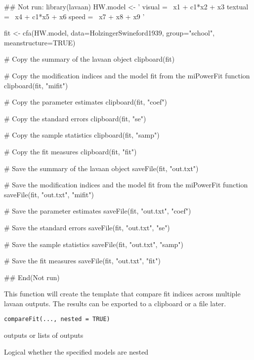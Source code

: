 \documentclass[a4paper]{book}
\begin{document}
\begin{Examples}
\begin{ExampleCode}
## Not run: 
library(lavaan)
HW.model <- ' visual  =~ x1 + c1*x2 + x3
              textual =~ x4 + c1*x5 + x6
               speed   =~ x7 + x8 + x9 '

fit <- cfa(HW.model, data=HolzingerSwineford1939, group="school", meanstructure=TRUE)

# Copy the summary of the lavaan object
clipboard(fit)

# Copy the modification indices and the model fit from the miPowerFit function
clipboard(fit, "mifit")

# Copy the parameter estimates
clipboard(fit, "coef")

# Copy the standard errors
clipboard(fit, "se")

# Copy the sample statistics
clipboard(fit, "samp")

# Copy the fit measures
clipboard(fit, "fit")

# Save the summary of the lavaan object
saveFile(fit, "out.txt")

# Save the modification indices and the model fit from the miPowerFit function
saveFile(fit, "out.txt", "mifit")

# Save the parameter estimates
saveFile(fit, "out.txt", "coef")

# Save the standard errors
saveFile(fit, "out.txt", "se")

# Save the sample statistics
saveFile(fit, "out.txt", "samp")

# Save the fit measures
saveFile(fit, "out.txt", "fit")

## End(Not run)
\end{ExampleCode}
\end{Examples}
%
\begin{Description}\relax
This function will create the template that compare fit indices across multiple lavaan outputs. The results can be exported to a clipboard or a file later. 
\end{Description}
%
\begin{Usage}
\begin{verbatim}
compareFit(..., nested = TRUE)
\end{verbatim}
\end{Usage}
%
\begin{Arguments}
\begin{ldescription}
\item[\code{...}] 
 outputs or lists of  outputs

\item[\code{nested}] 
Logical whether the specified models are nested

\end{ldescription}
\end{Arguments}
\end{document}
